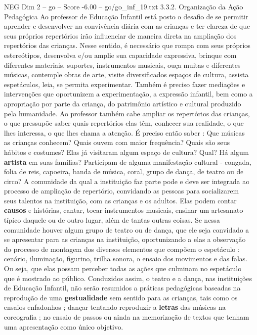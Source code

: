 \begin{textsample}{NEG Dim 2 – go – Score -6.00 – go/go\_inf\_19.txt}  \label{ex:f2_neg_111}
3.3.2.
Organização da Ação Pedagógica Ao professor de Educação Infantil está posto o desafio de se permitir aprender e desenvolver na convivência diária com as crianças e ter clareza de que seus próprios repertórios irão influenciar de maneira direta na ampliação dos repertórios das crianças.
Nesse sentido, é necessário que rompa com seus próprios estereótipos, desenvolva e/ou amplie sua capacidade expressiva, brinque com diferentes materiais, suportes, instrumentos musicais, ouça muitas e diferentes músicas, contemple obras de arte, visite diversificados espaços de cultura, assista espetáculos, leia, se permita experimentar.
Também é preciso fazer mediações e intervenções que oportunizem a experimentação, a expressão infantil, bem como a apropriação por parte da criança, do patrimônio artístico e cultural produzido pela humanidade.
Ao professor também cabe ampliar os repertórios das crianças, o que pressupõe saber quais repertórios elas têm, conhecer sua realidade, o que lhes interessa, o que lhes chama a atenção.
É preciso então saber : Que músicas as crianças conhecem?
Quais ouvem com maior frequência?
Quais são seus hábitos e costumes?
Elas já visitaram algum espaço de cultura?
Qual?
Há algum \textbf{artista} em suas famílias?
Participam de alguma manifestação cultural - congada, folia de reis, capoeira, banda de música, coral, grupo de dança, de teatro ou de circo?
A comunidade da qual a instituição faz parte pode e deve ser integrada ao processo de ampliação de repertório, convidando as pessoas para socializarem seus talentos na instituição, com as crianças e os adultos.
Elas podem contar \textbf{causos} e histórias, cantar, tocar instrumentos musicais, ensinar um artesanato típico daquele ou de outro lugar, além de tantas outras coisas.
Se nessa comunidade houver algum grupo de teatro ou de dança, que ele seja convidado a se apresentar para as crianças na instituição, oportunizando a elas a observação do processo de montagem dos diversos elementos que compõem o espetáculo : cenário, iluminação, figurino, trilha sonora, o ensaio dos movimentos e das falas.
Ou seja, que elas possam perceber todas as ações que culminam no espetáculo que é mostrado ao público.
Conduzidos assim, o teatro e a dança, nas instituições de Educação Infantil, não serão resumidos a práticas pedagógicas baseadas na reprodução de uma \textbf{gestualidade} sem sentido para as crianças, tais como os ensaios enfadonhos ; dançar tentando reproduzir a \textbf{letras} das músicas na coreografia ; no ensaio de passos ou ainda na memorização de textos que tenham uma apresentação como único objetivo.

\end{textsample}
